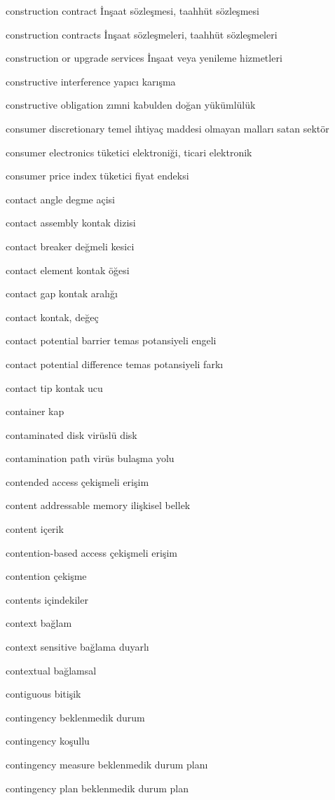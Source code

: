 \documentclass[12pt,fleqn]{article}\usepackage{../../common}
\begin{document}
construction contract İnşaat sözleşmesi, taahhüt sözleşmesi

construction contracts İnşaat sözleşmeleri, taahhüt sözleşmeleri

construction or upgrade services İnşaat veya yenileme hizmetleri

constructive interference yapıcı karışma

constructive obligation zımni kabulden doğan yükümlülük

consumer discretionary temel ihtiyaç maddesi olmayan malları satan sektör

consumer electronics tüketici elektroniği, ticari elektronik

consumer price index tüketici fiyat endeksi

contact angle degme açisi

contact assembly kontak dizisi

contact breaker değmeli kesici

contact element kontak öğesi

contact gap kontak aralığı

contact kontak, değeç

contact potential barrier temas potansiyeli engeli

contact potential difference temas potansiyeli farkı

contact tip kontak ucu

container kap

contaminated disk virüslü disk

contamination path virüs bulaşma yolu

contended access çekişmeli erişim

content addressable memory ilişkisel bellek

content içerik

contention-based access çekişmeli erişim

contention çekişme

contents içindekiler

context bağlam

context sensitive bağlama duyarlı

contextual bağlamsal

contiguous bitişik

contingency beklenmedik durum

contingency koşullu

contingency measure beklenmedik durum planı

contingency plan beklenmedik durum plan
\end{document}
